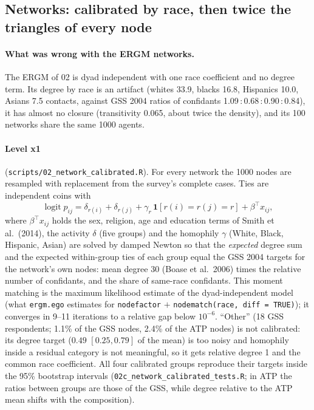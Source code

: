 \documentclass[11pt,a4paper]{article}
\newcommand{\code}[1]{\texttt{#1}}
\begin{document}
\subsection{Networks: calibrated by race, then twice the triangles of every node}
\label{sec:networks}

\paragraph{What was wrong with the ERGM networks.} The ERGM of 02 is dyad independent with
one race coefficient and no degree term. Its degree by race is an artifact (whites 33.9,
blacks 16.8, Hispanics 10.0, Asians 7.5 contacts, against GSS 2004 ratios of confidants
1.09\,:\,0.68\,:\,0.90\,:\,0.84), it has almost no closure (transitivity 0.065, about twice the
density), and its 100 networks share the same 1000 agents.

\paragraph{Level x1} (\code{scripts/02\_network\_calibrated.R}). For every network the 1000
nodes are resampled with replacement from the survey's complete cases. Ties are independent
coins with
\begin{equation*}
  \operatorname{logit} p_{ij} = \delta_{r(i)} + \delta_{r(j)} + \gamma_{r}\,\mathbf{1}[r(i) = r(j) = r]
  + \beta^{\top} x_{ij},
\end{equation*}
where $\beta^{\top} x_{ij}$ holds the sex, religion, age and education terms of Smith et al.\
(2014), the activity $\delta$ (five groups) and the homophily $\gamma$ (White, Black,
Hispanic, Asian) are solved by damped Newton so that the \emph{expected} degree sum and the
expected within-group ties of each group equal the GSS 2004 targets for the network's own
nodes: mean degree 30 (Boase et al.\ 2006) times the relative number of confidants, and
the share of same-race confidants. This moment matching is the maximum likelihood estimate
of the dyad-independent model (what \code{ergm.ego} estimates for
\code{nodefactor} $+$ \code{nodematch(race, diff = TRUE)}); it converges in 9--11 iterations
to a relative gap below $10^{-6}$. ``Other'' (18 GSS respondents; 1.1\% of the GSS nodes,
2.4\% of the ATP nodes) is not calibrated: its degree target ($0.49$ $[0.25, 0.79]$ of the
mean) is too noisy and homophily inside a residual category is not meaningful, so it gets
relative degree 1 and the common race coefficient. All four calibrated groups reproduce
their targets inside the 95\% bootstrap intervals (\code{02c\_network\_calibrated\_tests.R};
in ATP the ratios between groups are those of the GSS, while degree relative to the ATP
mean shifts with the composition).
\end{document}
